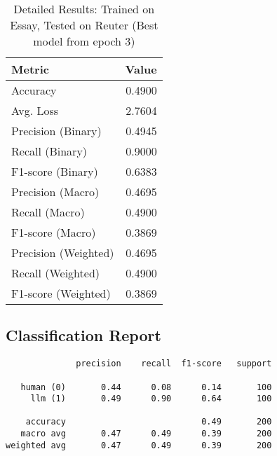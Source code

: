 \documentclass{article}
\begin{document}
\begin{table}[htbp]
\centering
\caption*{Detailed Results: Trained on Essay, Tested on Reuter (Best model from epoch 3)}
\begin{tabular}{@{}lr@{}}
\toprule
Metric & Value \\
\midrule
Accuracy & 0.4900 \\
Avg. Loss & 2.7604 \\
Precision (Binary) & 0.4945 \\
Recall (Binary) & 0.9000 \\
F1-score (Binary) & 0.6383 \\
Precision (Macro) & 0.4695 \\
Recall (Macro) & 0.4900 \\
F1-score (Macro) & 0.3869 \\
Precision (Weighted) & 0.4695 \\
Recall (Weighted) & 0.4900 \\
F1-score (Weighted) & 0.3869 \\
\bottomrule
\end{tabular}
\subsection*{Classification Report}
\begin{verbatim}
              precision    recall  f1-score   support

   human (0)       0.44      0.08      0.14       100
     llm (1)       0.49      0.90      0.64       100

    accuracy                           0.49       200
   macro avg       0.47      0.49      0.39       200
weighted avg       0.47      0.49      0.39       200
\end{verbatim}
\end{table}
\end{document}
